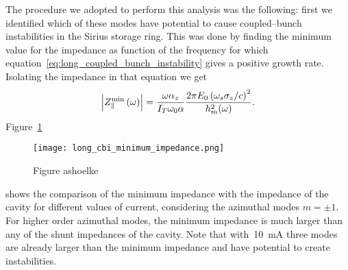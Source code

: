     The procedure we adopted to perform this analysis was the following: first we identified which of these modes have potential to cause coupled--bunch instabilities in the Sirius storage ring. This was done by finding the minimum value for the impedance as function of the frequency for which equation~\eqref{eq:long_coupled_bunch_instability} gives a positive growth rate. Isolating the impedance in that equation we get
    \begin{align}\label{eq:long_cbi_minimum_impedance}
        \left|Z_\parallel^\text{min}\left(\omega\right)\right| = \frac{\omega\alpha_z}{I_T\omega_0\alpha}\frac{2\pi E_0\left(\omega_s\sigma_z/c\right)^2}{h_m^2(\omega)}.
    \end{align}
    Figure~\ref{fig:long_cbi_minimum_impedance}
    \begin{figure}
        \centering
        \texttt{[image: long\_cbi\_minimum\_impedance.png]}
        \caption{Figure ashoelke}
        \label{fig:long_cbi_minimum_impedance}
    \end{figure}
    shows the comparison of the minimum impedance with the impedance of the cavity for different values of current, considering the azimuthal modes $m=\pm1$. For higher order azimuthal modes, the minimum impedance is much larger than any of the shunt impedances of the cavity. Note that with~\SI{10}{\milli\ampere} three modes are already larger than the minimum impedance and have potential to create instabilities.

